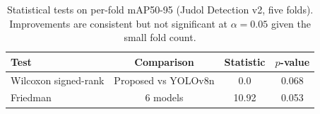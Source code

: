 \begin{table}[t]
\centering
\caption{Statistical tests on per-fold mAP50-95 (Judol Detection v2, five folds). Improvements are consistent but not significant at $\alpha=0.05$ given the small fold count.}
\label{tab:stats}
\begin{tabular}{@{}lccc@{}}
\toprule
\textbf{Test} & \textbf{Comparison} & \textbf{Statistic} & \textbf{$p$-value} \\
\midrule
Wilcoxon signed-rank & Proposed vs YOLOv8n & 0.0 & 0.068 \\
Friedman & 6 models & 10.92 & 0.053 \\
\bottomrule
\end{tabular}
\end{table}
